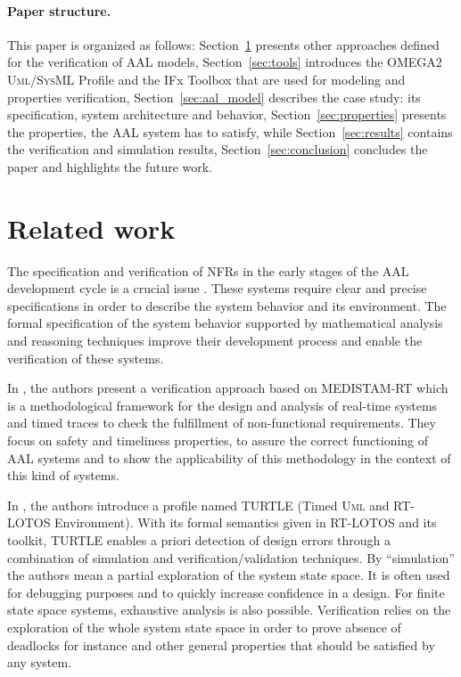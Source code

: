 \documentclass[a4paper,twoside]{article}
\def\UML{\textsc{Uml}}
\def\SysML{\textsc{SysML}}
\begin{document}
\paragraph*{Paper structure.} This paper is organized as follows: Section~\ref{sec:r_work} presents other approaches defined for the verification of AAL models, Section~\ref{sec:tools} introduces the OMEGA2 \UML{}/\SysML{} Profile and the IFx Toolbox that are used for modeling and properties verification, Section~\ref{sec:aal_model} describes the case study: its specification, system architecture and behavior, Section~\ref{sec:properties} presents the properties, the AAL system has to satisfy, while Section~\ref{sec:results} contains the verification and simulation results, Section~\ref{sec:conclusion} concludes the paper and highlights the future work.

\section{Related work}
\label{sec:r_work}

\noindent The specification and verification of NFRs in the early stages of the AAL development cycle is a crucial issue \cite{test9}. These systems require clear and precise specifications in order to describe the system behavior and its environment. The formal specification of the system behavior supported by mathematical analysis and reasoning techniques improve their development process and enable the verification of these systems. 

In \cite{test10}, the authors present a verification approach based on MEDISTAM-RT which is a methodological framework for the design and analysis of real-time systems and timed traces to check the fulfillment of non-functional requirements. They focus on  safety and timeliness properties, to assure the correct functioning of AAL systems and to show the applicability of this methodology in the context of this kind of systems. 

In \cite{test11}, the authors introduce a profile named TURTLE (Timed \UML{} and RT-LOTOS Environment). With its formal semantics given in RT-LOTOS and its toolkit, TURTLE enables a priori detection of design errors through a combination of simulation and verification/validation techniques. By “simulation” the authors mean a partial exploration of the system state space. It is often used for debugging purposes and to quickly increase confidence in a design. For finite state space systems, exhaustive analysis is also possible. Verification relies 
on the exploration of the whole system state space in order to prove absence of deadlocks for instance and other general properties that should be satisfied by any system.
\end{document}
